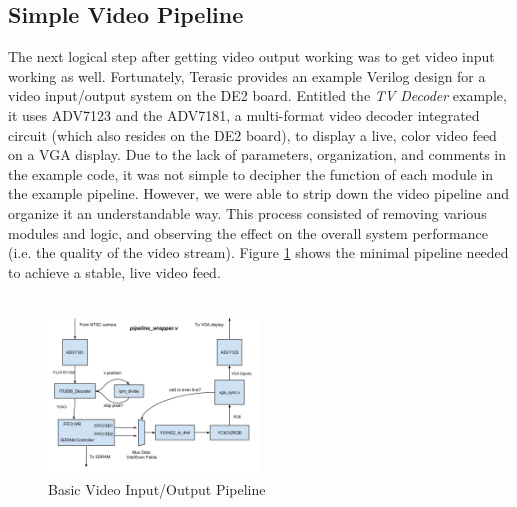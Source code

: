 \documentclass[11pt]{article} %
\begin{document}
\subsection{Simple Video Pipeline}
\label{sec:pipe}
The next logical step after getting video output working was to get video input working as well. Fortunately, Terasic provides an example Verilog design for a video input/output system on the DE2 board. Entitled the \textit{TV Decoder} example, it uses ADV7123 and the ADV7181, a multi-format video decoder integrated circuit (which also resides on the DE2 board), to display a live, color video feed on a VGA display. Due to the lack of parameters, organization, and comments in the example code, it was not simple to decipher the function of each module in the example pipeline. However, we were able to strip down the video pipeline and organize it an understandable way. This process consisted of removing various modules and logic, and observing the effect on the overall system performance (i.e. the quality of the video stream). Figure \ref{fig:basicPipe} shows the minimal pipeline needed to achieve a stable, live video feed.\\\\
\FloatBarrier
\begin{figure}[h]
\centering
\includegraphics[width=0.5\textwidth]{./images/demoPipeline.jpg}
\caption{Basic Video Input/Output Pipeline}
\label{fig:basicPipe}
\end{figure}
\FloatBarrier
\end{document}
